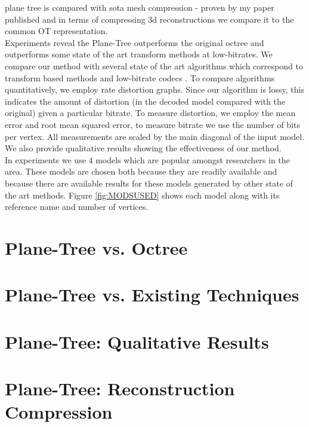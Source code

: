 
plane tree is compared with sota mesh compression - proven by my paper published and in terms of compressing 3d reconstructions we compare it to the common OT representation. \\

Experiments reveal the Plane-Tree outperforms the original octree and outperforms some state of the art transform methods at low-bitrates. We compare our method with several state of the art algorithms which correspond to transform based methods \cite{Khodakovsky00Progressive,Bayazit103DMesh} and low-bitrate codecs \cite{Peng10Feature}. To compare algorithms quantitatively, we employ rate distortion graphs. Since our algorithm is lossy, this indicates the amount of distortion (in the decoded model compared with the original) given a particular bitrate. To measure distortion, we employ the mean error and root mean squared error, to measure bitrate we use the number of bits per vertex. All measurements are scaled by the main diagonal of the input model. We also provide qualitative results showing the effectiveness of our method. \\

In experiments we use 4 models which are popular amongst researchers in the area. These models are chosen both because they are readily available and because there are available results for these models generated by other state of the art methods. Figure \ref{fig:MODSUSED} shows each model along with its reference name and number of vertices. \\

\section{Plane-Tree vs. Octree}

\section{Plane-Tree vs. Existing Techniques}

\section{Plane-Tree: Qualitative Results}

\section{Plane-Tree: Reconstruction Compression}




